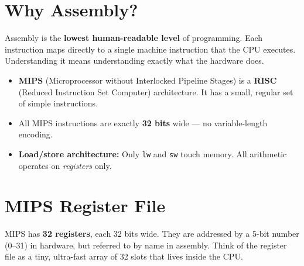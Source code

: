 \documentclass[11pt, letterpaper]{article}
\begin{document}
\vspace{8pt}

\section*{Why Assembly?}

Assembly is the \textbf{lowest human-readable level} of programming. Each instruction maps directly to a single machine instruction that the CPU executes. Understanding it means understanding exactly what the hardware does.

\begin{itemize}[noitemsep]
  \item \textbf{MIPS} (Microprocessor without Interlocked Pipeline Stages) is a \textbf{RISC} (Reduced Instruction Set Computer) architecture. It has a small, regular set of simple instructions.
  \item All MIPS instructions are exactly \textbf{32 bits} wide --- no variable-length encoding.
  \item \textbf{Load/store architecture:} Only \texttt{lw} and \texttt{sw} touch memory. All arithmetic operates on \emph{registers} only.
\end{itemize}

\section*{MIPS Register File}

MIPS has \textbf{32 registers}, each 32 bits wide. They are addressed by a 5-bit number (0--31) in hardware, but referred to by name in assembly. Think of the register file as a tiny, ultra-fast array of 32 slots that lives inside the CPU.
\end{document}
